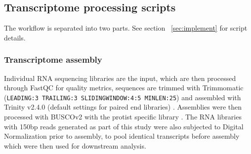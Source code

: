\documentclass[12pt]{article}
\begin{document}
\subsection{Transcriptome processing scripts}
\label{sec:trans-processing}
The workflow is separated into two parts. 
See section ~\ref{sec:implement} for script details.
\subsubsection{Transcriptome assembly}
Individual RNA sequencing libraries are the input, which are then processed through FastQC \cite{fastqc} for quality metrics, sequences are trimmed with Trimmomatic (\texttt{LEADING:3 TRAILING:3 SLIDINGWINDOW:4:5 MINLEN:25}) \cite{bolger2014trimmomatic} and assembled with Trinity v2.4.0 (default settings for paired end libraries) \cite{haas2013novo}. 
Assemblies were then processed with BUSCOv2 with the protist specific library \cite{simao2015busco}.
The RNA libraries with 150bp reads generated as part of this study were also subjected to Digital Normalization \cite{diginorm} prior to assembly, to pool identical transcripts before assembly which were then used for downstream analysis.                                                                                                                                                                                                                                                                                                                                                                                                                                                                                                                                                                                                                                                                                                                                                                                                                                                                                                                                                                                                                                                                                                                                                                                                                                                                                                                                        
\end{document}
